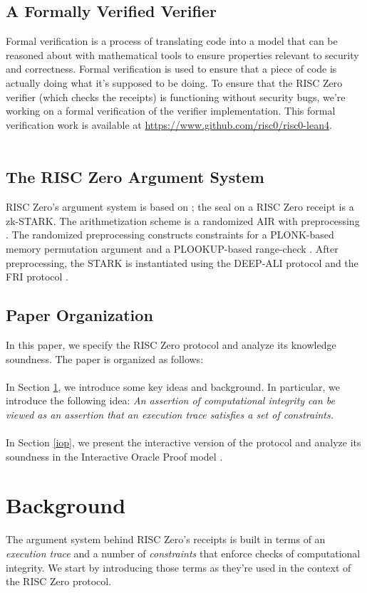 \documentclass[10pt,letterpaper,titlepage]{article}
\theoremstyle{definition}
\begin{document}
\subsection{A Formally Verified Verifier}
Formal verification is a process of translating code into a model that can be reasoned about with mathematical tools to ensure properties relevant to security and correctness.
Formal verification is used to ensure that a piece of code is actually doing what it's supposed to be doing.
To ensure that the RISC Zero verifier (which checks the receipts) is functioning without security bugs, we're working on a formal verification of the verifier implementation.
This formal verification work is available at \url{https://www.github.com/risc0/risc0-lean4}.\\
\\
\subsection{The RISC Zero Argument System}
RISC Zero's argument system is based on \cite{stark};
the seal on a RISC Zero receipt is a zk-STARK.
The arithmetization scheme is a randomized AIR with preprocessing \cite{RAP}.
The randomized preprocessing constructs constraints for a PLONK-based memory permutation argument and a PLOOKUP-based range-check \cite{plonk, plookup}.
After preprocessing, the STARK is instantiated using the DEEP-ALI protocol and the FRI protocol \cite{deepFRI, fri}.

\subsection{Paper Organization}
In this paper, we specify the RISC Zero protocol and analyze its knowledge soundness.
The paper is organized as follows:\\
\\
In Section \ref{background}, we introduce some key ideas and background.
In particular, we introduce the following idea:
\textit{An assertion of computational integrity can be viewed as an assertion that an execution trace satisfies a set of constraints.}\\
\\
In Section \ref{iop}, we present the interactive version of the protocol and analyze its soundness in the Interactive Oracle Proof model \cite{iop}. \\
\section{Background}
\label{background}
The argument system behind RISC Zero's receipts is built in terms of an \textit{execution trace} and a number of \textit{constraints} that enforce checks of computational integrity.
We start by introducing those terms as they're used in the context of the RISC Zero protocol.
\end{document}
